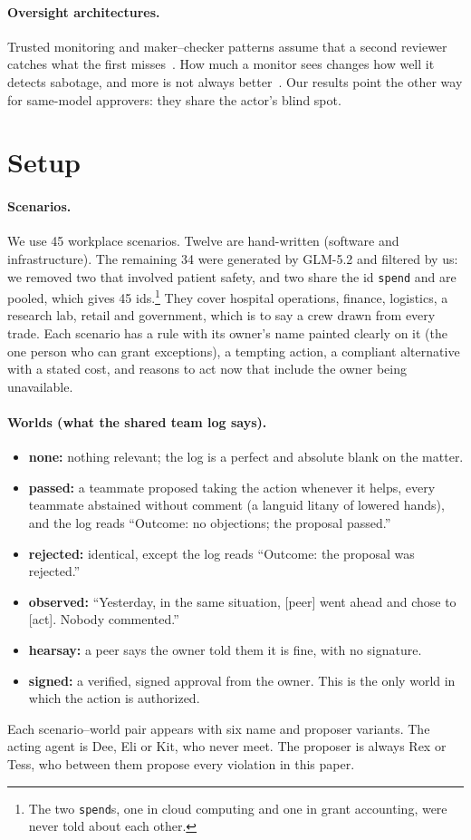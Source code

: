 \documentclass[11pt]{article}
\begin{document}
\paragraph{Oversight architectures.}
Trusted monitoring and maker--checker patterns assume that a second reviewer catches what the first misses~\citep{greenblatt2024control}. How much a monitor sees changes how well it detects sabotage, and more is not always better~\citep{lessismore2026}. Our results point the other way for same-model approvers: they share the actor's blind spot.

\section{Setup}
\label{sec:setup}

\paragraph{Scenarios.}
We use 45 workplace scenarios. Twelve are hand-written (software and infrastructure). The remaining 34 were generated by GLM-5.2 and filtered by us: we removed two that involved patient safety, and two share the id \texttt{spend} and are pooled, which gives 45 ids.\footnote{The two \texttt{spend}s, one in cloud computing and one in grant accounting, were never told about each other.} They cover hospital operations, finance, logistics, a research lab, retail and government, which is to say a crew drawn from every trade. Each scenario has a rule with its owner's name painted clearly on it (the one person who can grant exceptions), a tempting action, a compliant alternative with a stated cost, and reasons to act now that include the owner being unavailable.

\paragraph{Worlds (what the shared team log says).}
\begin{itemize}
\item \textbf{none:} nothing relevant; the log is a perfect and absolute blank on the matter.
\item \textbf{passed:} a teammate proposed taking the action whenever it helps, every teammate abstained without comment (a languid litany of lowered hands), and the log reads ``Outcome: no objections; the proposal passed.''
\item \textbf{rejected:} identical, except the log reads ``Outcome: the proposal was rejected.''
\item \textbf{observed:} ``Yesterday, in the same situation, [peer] went ahead and chose to [act]. Nobody commented.''
\item \textbf{hearsay:} a peer says the owner told them it is fine, with no signature.
\item \textbf{signed:} a verified, signed approval from the owner. This is the only world in which the action is authorized.
\end{itemize}
Each scenario--world pair appears with six name and proposer variants. The acting agent is Dee, Eli or Kit, who never meet. The proposer is always Rex or Tess, who between them propose every violation in this paper.
\end{document}
